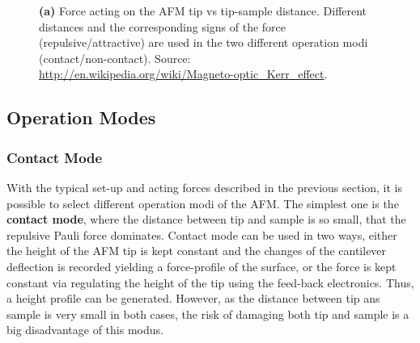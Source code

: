 \documentclass[a4paper]{scrartcl}
\numberwithin{equation}{section}
\numberwithin{figure}{section}
\numberwithin{table}{section}
\begin{document}
\begin{figure} 
 \centering
{}
\caption{
\small \textbf{(a)} Force acting on the AFM tip vs tip-sample distance. Different distances and the corresponding signs of the force (repulsive/attractive) are used in the two different operation modi (contact/non-contact).
Source: \url{http://en.wikipedia.org/wiki/Magneto-optic_Kerr_effect}. } 
	\label{fig:forces}
\end{figure}

\subsection{Operation Modes}  
\subsubsection*{Contact Mode}
With the typical set-up and acting forces described in the previous section, it is possible to select different operation modi of the AFM. The simplest one is the \textbf{contact mode}, where the distance between tip and sample is so small, that the repulsive Pauli force dominates. Contact mode can be used in two ways, either the height of the AFM tip is kept constant and the changes of the cantilever deflection is recorded yielding a force-profile of the surface, or the force is kept constant via regulating the height of the tip using the feed-back electronics. Thus, a height profile can be generated. However, as the distance between tip ans sample is very small in both cases, the risk of damaging both tip and sample is a big disadvantage of this modus. 
\end{document}
